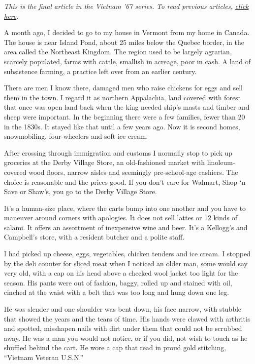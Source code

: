 \emph{This is the final article in the Vietnam '67 series. To read
previous articles,}
\href{https://www.nytimes3xbfgragh.onion/column/vietnam-67}{\emph{click
here}}\emph{.}

A month ago, I decided to go to my house in Vermont from my home in
Canada. The house is near Island Pond, about 25 miles below the Quebec
border, in the area called the Northeast Kingdom. The region used to be
largely agrarian, scarcely populated, farms with cattle, smallish in
acreage, poor in cash. A land of subsistence farming, a practice left
over from an earlier century.

There are men I know there, damaged men who raise chickens for eggs and
sell them in the town. I regard it as northern Appalachia, land covered
with forest that once was open land back when the king needed ship's
masts and timber and sheep were important. In the beginning there were a
few families, fewer than 20 in the 1830s. It stayed like that until a
few years ago. Now it is second homes, snowmobiling, four-wheelers and
soft ice cream.

After crossing through immigration and customs I normally stop to pick
up groceries at the Derby Village Store, an old-fashioned market with
linoleum-covered wood floors, narrow aisles and seemingly pre-school-age
cashiers. The choice is reasonable and the prices good. If you don't
care for Walmart, Shop `n Save or Shaw's, you go to the Derby Village
Store.

It's a human-size place, where the carts bump into one another and you
have to maneuver around corners with apologies. It does not sell lattes
or 12 kinds of salami. It offers an assortment of inexpensive wine and
beer. It's a Kellogg's and Campbell's store, with a resident butcher and
a polite staff.

I had picked up cheese, eggs, vegetables, chicken tenders and ice cream.
I stopped by the deli counter for sliced meat when I noticed an older
man, some would say very old, with a cap on his head above a checked
wool jacket too light for the season. His pants were out of fashion,
baggy, rolled up and stained with oil, cinched at the waist with a belt
that was too long and hung down one leg.

He was slender and one shoulder was bent down, his face narrow, with
stubble that showed the years and the tears of time. His hands were
clawed with arthritis and spotted, misshapen nails with dirt under them
that could not be scrubbed away. He was a man you would not notice, or
if you did, not wish to touch as he shuffled behind the cart. He wore a
cap that read in proud gold stitching, ``Vietnam Veteran U.S.N.''

